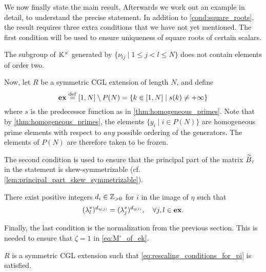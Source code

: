 We now finally state the main result. Afterwards we work out an example in detail, to
understand the precise statement. In addition to \cref{cond:square_roots}, the result
requires three extra conditions that we have not yet mentioned. The first condition
will be used to ensure uniqueness of square roots of certain scalars.
\begin{condition}\label{cond:no_order_two}
	The subgroup of $\mathbb{K}^\times$ generated by $\{\nu_{lj} \mid 1 \leq j < l \leq N\}$ does not contain elements of order two.
\end{condition}
%
Now, let $R$ be a symmetric CGL extension of length $N$, and define
\begin{equation}\label{eq:ex}
	\mathbf{ex} \overset{\mathrm{def}}{=} [1 ,N] \setminus P(N) = \{k \in [1, N] \mid s(k) \neq +\infty\}
\end{equation}
%
where $s$ is the predecessor function as in \cref{thm:homogeneous_primes}. Note that by
\cref{thm:homogeneous_primes}, the elements $\{y_i \mid i \in P(N)\}$ are homogeneous
prime elements with respect to \emph{any} possible ordering of the generators. The
elements of $P(N)$ are therefore taken to be frozen.

The second condition is used to ensure that the principal part of the matrix $\widetilde{B}_\tau$
in the statement is skew-symmetrizable (cf.
\cref{lem:principal_part_skew_symmetrizable}).
\begin{condition}\label{cond:lambda_star_to_the_d}
	There exist positive integers $d_i \in \mathbb{Z}_{>0}$ for $i$ in the image of $\eta$ such that
	\begin{equation*}
		(\lambda^*_l)^{d_{\eta(j)}} = (\lambda^*_j)^{d_{\eta(l)}}, \quad \forall j, l \in \mathbf{ex}.
	\end{equation*}
\end{condition}

Finally, the last condition is the normalization from the previous section. This is
needed to ensure that $\zeta = 1$ in \cref{eq:M'_of_ek}.
\begin{condition}\label{cond:normalization_generators}
	$R$ is a symmetric CGL extension such that \cref{eq:rescaling_conditions_for_pi} is satisfied.
\end{condition}

